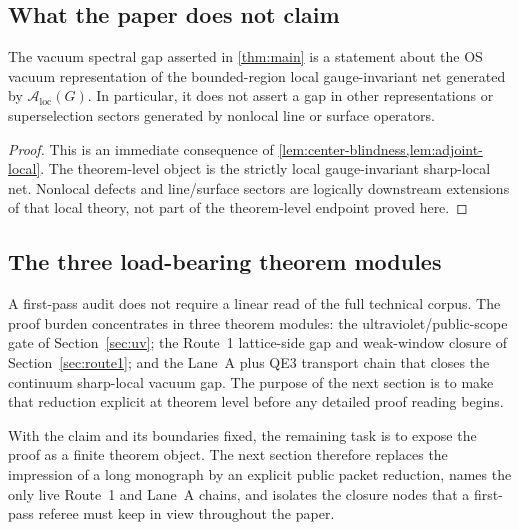 \subsection{What the paper does not claim}

\begin{corollary}\label{cor:scope-gap}
The vacuum spectral gap asserted in \cref{thm:main} is a statement about the OS vacuum representation of the bounded-region local gauge-invariant net generated by $\mathcal A_{\mathrm{loc}}(G)$. In particular, it does not assert a gap in other representations or superselection sectors generated by nonlocal line or surface operators.
\end{corollary}

\begin{proof}
This is an immediate consequence of \cref{lem:center-blindness,lem:adjoint-local}. The theorem-level object is the strictly local gauge-invariant sharp-local net. Nonlocal defects and line/surface sectors are logically downstream extensions of that local theory, not part of the theorem-level endpoint proved here.
\end{proof}

\subsection{The three load-bearing theorem modules}

A first-pass audit does not require a linear read of the full technical corpus. The proof burden concentrates in three theorem modules: the ultraviolet/public-scope gate of Section~\ref{sec:uv}; the Route~1 lattice-side gap and weak-window closure of Section~\ref{sec:route1}; and the Lane~A plus QE3 transport chain that closes the continuum sharp-local vacuum gap. The purpose of the next section is to make that reduction explicit at theorem level before any detailed proof reading begins.

With the claim and its boundaries fixed, the remaining task is to expose the proof as a finite theorem object. The next section therefore replaces the impression of a long monograph by an explicit public packet reduction, names the only live Route~1 and Lane~A chains, and isolates the closure nodes that a first-pass referee must keep in view throughout the paper.

